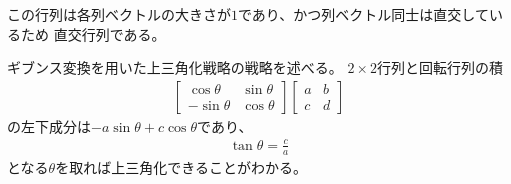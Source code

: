 \documentclass{jarticle}
\begin{document}
この行列は各列ベクトルの大きさが$1$であり、かつ列ベクトル同士は直交しているため
直交行列である。
\par
ギブンス変換を用いた上三角化戦略の戦略を述べる。
$2\times 2$行列と回転行列の積
\begin{align}
\begin{bmatrix}
 \cos \theta    & \sin \theta \\
-\sin \theta    & \cos \theta 
\end{bmatrix}
\begin{bmatrix}
 a & b \\ c & d
\end{bmatrix}
\end{align}
の左下成分は$-a\sin\theta+c\cos\theta$であり、
\begin{align}
\tan \theta = \frac{c}{a}
\end{align}
となる$\theta$を取れば上三角化できることがわかる。
\end{document}
